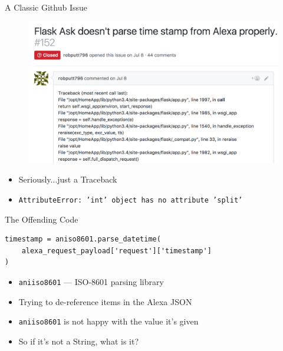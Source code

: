 \documentclass[10pt]{beamer}
\begin{document}
\begin{frame}[fragile]{A Classic Github Issue}
	\begin{figure}
		\centering
		\includegraphics[width=\textwidth]{images/issue.png}
	\end{figure}
	\begin{itemize}
		\item Seriously...just a Traceback
		\item \texttt{AttributeError: 'int' object has no attribute 'split'}
	\end{itemize}
\end{frame}

\begin{frame}[fragile]{The Offending Code}
	\begin{verbatim}
timestamp = aniso8601.parse_datetime(
	alexa_request_payload['request']['timestamp']
)
	\end{verbatim}
	\begin{itemize}
		\item \texttt{aniiso8601} --- ISO-8601 parsing library
		\item Trying to de-reference items in the Alexa JSON
		\item \texttt{aniiso8601} is not happy with the value it's given
		\item So if it's not a String, what is it?
	\end{itemize}
\end{frame}
\end{document}
